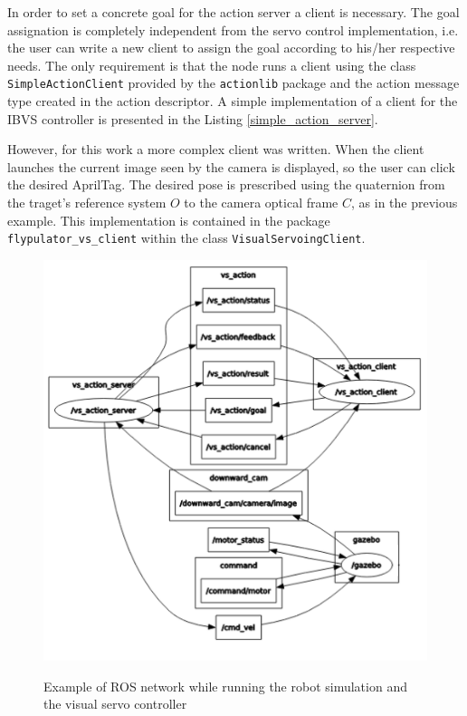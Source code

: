 In order to set a concrete goal for the action server a client is necessary. The goal assignation is completely independent from the servo control implementation, i.e. the user can write a new client to assign the goal according to his/her respective needs. The only requirement is that the node runs a client using the class \texttt{SimpleActionClient} provided by the \texttt{actionlib} package and the action message type created in the action descriptor. A simple implementation of a client for the IBVS controller is presented in the Listing \ref{simple_action_server}.

However, for this work a more complex client was written. When the client launches the current image seen by the camera is displayed, so the user can click the desired AprilTag. The desired pose is prescribed using the quaternion from the traget's reference system $O$ to the camera optical frame $C$, as in the previous example. This implementation is contained in the package \texttt{flypulator\_vs\_client} within the class \texttt{VisualServoingClient}.


\begin{figure}[!htb]
	\caption{Example of ROS network while running the robot simulation and the visual servo controller}
	\centering
	\includegraphics[width=\textwidth]{content/chapter_05/images/action_interface_rqt.png}
	\label{fig:action_interface_ros}
\end{figure}

